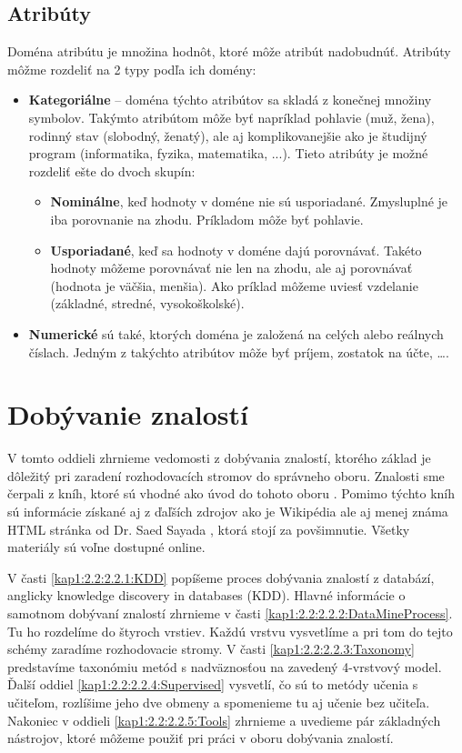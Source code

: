 \subsection{Atribúty}\label{kap1:2.1:2.1.2:DataAttributes}
Doména atribútu je množina hodnôt, ktoré môže atribút nadobudnúť. Atribúty môžme rozdeliť na 2 typy podľa ich domény:
\begin{itemize}
\item \textbf{Kategoriálne} -- doména týchto atribútov sa skladá z konečnej množiny symbolov. Takýmto atribútom môže byť napríklad pohlavie (muž, žena), rodinný stav (slobodný, ženatý), ale aj komplikovanejšie ako je študijný program (informatika, fyzika, matematika, ...). Tieto atribúty je možné rozdeliť ešte do dvoch skupín:
\begin{itemize}
\item \textbf{Nominálne}, keď hodnoty v doméne nie sú usporiadané. Zmysluplné je iba porovnanie na zhodu. Príkladom môže byť pohlavie.
\item \textbf{Usporiadané}, keď sa hodnoty v doméne dajú porovnávať. Takéto hodnoty môžeme porovnávať nie len na zhodu, ale aj porovnávať (hodnota je väčšia, menšia). Ako príklad môžeme uviesť vzdelanie (základné, stredné, vysokoškolské).
\end{itemize}
\item \textbf{Numerické} sú také, ktorých doména je založená na celých alebo reálnych číslach. Jedným z takýchto atribútov môže byť príjem, zostatok na účte, \ldots. 
\end{itemize}

\section{Dobývanie znalostí}\label{kap1:2.2:DataMining}
V tomto oddieli zhrnieme vedomosti z dobývania znalostí, ktorého základ je dôležitý pri zaradení rozhodovacích stromov do správneho oboru.
Znalosti sme čerpali z kníh, ktoré sú vhodné ako úvod do tohoto oboru \cite{kap1-DataMiningAndAnalysis,kap1-DataMiningForMasses,kap1-DataMiningForTrees,kap1-StatisticLearn}. Pomimo týchto kníh sú informácie získané aj z ďaľších zdrojov ako je Wikipédia \cite{wiki-DataMining} ale aj menej známa HTML stránka od Dr. Saed Sayada \cite{online-DataMining}, ktorá stojí za povšimnutie. Všetky materiály sú voľne dostupné online.
 
V časti \ref{kap1:2.2:2.2.1:KDD} popíšeme proces dobývania znalostí z databází, anglicky knowledge discovery in databases (KDD). Hlavné informácie o samotnom dobývaní znalostí zhrnieme v časti \ref{kap1:2.2:2.2.2:DataMineProcess}. Tu ho rozdelíme do štyroch vrstiev. Každú vrstvu vysvetlíme a pri tom do tejto schémy zaradíme rozhodovacie stromy. V časti \ref{kap1:2.2:2.2.3:Taxonomy} predstavíme taxonómiu metód s nadväznosťou na zavedený 4-vrstvový model. Ďalší oddiel \ref{kap1:2.2:2.2.4:Supervised} vysvetlí, čo sú to metódy učenia s učiteľom, rozlíšime jeho dve obmeny a spomenieme tu aj učenie bez učiteľa.
Nakoniec v oddieli \ref{kap1:2.2:2.2.5:Tools} zhrnieme a uvedieme pár základných nástrojov, ktoré môžeme použiť pri práci v oboru dobývania znalostí. 

